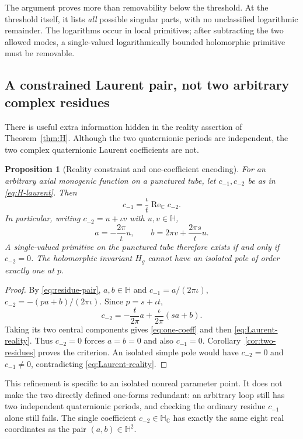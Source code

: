 \documentclass[11pt,a4paper]{article}
\numberwithin{equation}{section}
\newtheorem{proposition}[theorem]{Proposition}
\theoremstyle{definition}
\theoremstyle{remark}
\newcommand{\C}{\mathbb C}
\newcommand{\HH}{\mathbb H}
\newcommand{\HC}{\mathbb H_{\C}}
\newcommand{\ReC}{\operatorname{Re}_{\C}}
\begin{document}
The argument proves more than removability below the threshold. At the
threshold itself, it lists \emph{all} possible singular parts, with no
unclassified logarithmic remainder. The logarithms occur in local
primitives; after subtracting the two allowed modes, a single-valued
logarithmically bounded holomorphic primitive must be removable.

\subsection{A constrained Laurent pair, not two arbitrary complex residues}
There is useful extra information hidden in the reality assertion of
Theorem~\ref{thm:H}. Although the two quaternionic periods are independent,
the two complex quaternionic Laurent coefficients are not.

\begin{proposition}[Reality constraint and one-coefficient encoding]
\label{prop:Laurent-reality}
For an arbitrary axial monogenic function on a punctured tube, let
$c_{-1},c_{-2}$ be as in \eqref{eq:H-laurent}. Then
\begin{equation}
 c_{-1}=\frac{\iota}{t}\ReC c_{-2}.\label{eq:Laurent-reality}
\end{equation}
In particular, writing $c_{-2}=u+\iota v$ with $u,v\in\HH$,
\begin{equation}
 a=-\frac{2\pi}{t}u,\qquad
 b=2\pi v+\frac{2\pi s}{t}u.\label{eq:one-coeff}
\end{equation}
A single-valued primitive on the punctured tube therefore exists if and
only if $c_{-2}=0$. The holomorphic invariant $H_g$ cannot have an
isolated pole of order exactly one at $p$.
\end{proposition}
\begin{proof}
By \eqref{eq:residue-pair}, $a,b\in\HH$ and
$c_{-1}=a/(2\pi\iota)$,
$c_{-2}=-(pa+b)/(2\pi\iota)$. Since $p=s+\iota t$,
\[
 c_{-2}=-\frac{t}{2\pi}a+\frac{\iota}{2\pi}(sa+b).
\]
Taking its two central components gives \eqref{eq:one-coeff} and then
\eqref{eq:Laurent-reality}. Thus $c_{-2}=0$ forces $a=b=0$ and also
$c_{-1}=0$. Corollary~\ref{cor:two-residues} proves the criterion.
An isolated simple pole would have $c_{-2}=0$ and $c_{-1}\ne0$,
contradicting \eqref{eq:Laurent-reality}.
\end{proof}
This refinement is specific to an isolated nonreal parameter point.
It does not make the two directly defined one-forms redundant: an arbitrary
loop still has two independent quaternionic periods, and checking the
ordinary residue $c_{-1}$ alone still fails. The single coefficient
$c_{-2}\in\HC$ has exactly the same eight real coordinates as the pair
$(a,b)\in\HH^2$.
\end{document}
